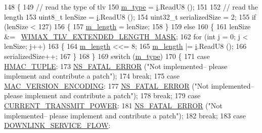 \begin{DoxyCode}
148 \{
149   \textcolor{comment}{// read the type of tlv}
150   \hyperlink{classns3_1_1Tlv_a16281bcabeafd34ba3a0f70823295ff2}{m\_type} = \hyperlink{bernuolliDistribution_8m_a6f6ccfcf58b31cb6412107d9d5281426}{i}.ReadU8 ();
151 
152   \textcolor{comment}{// read the length}
153   uint8\_t lenSize = \hyperlink{bernuolliDistribution_8m_a6f6ccfcf58b31cb6412107d9d5281426}{i}.ReadU8 ();
154   uint32\_t serializedSize = 2;
155   \textcolor{keywordflow}{if} (lenSize < 127)
156     \{
157       \hyperlink{classns3_1_1Tlv_a283be5043bd1d6accea0fb54b27824ce}{m\_length} = lenSize;
158     \}
159   \textcolor{keywordflow}{else}
160     \{
161       lenSize &= ~\hyperlink{wimax-tlv_8h_a590060b4cac40c59bb72398847174fae}{WIMAX\_TLV\_EXTENDED\_LENGTH\_MASK};
162       \textcolor{keywordflow}{for} (\textcolor{keywordtype}{int} j = 0; j < lenSize; j++)
163         \{
164           \hyperlink{classns3_1_1Tlv_a283be5043bd1d6accea0fb54b27824ce}{m\_length} <<= 8;
165           \hyperlink{classns3_1_1Tlv_a283be5043bd1d6accea0fb54b27824ce}{m\_length} |= \hyperlink{bernuolliDistribution_8m_a6f6ccfcf58b31cb6412107d9d5281426}{i}.ReadU8 ();
166           serializedSize++;
167         \}
168     \}
169   \textcolor{keywordflow}{switch} (\hyperlink{classns3_1_1Tlv_a16281bcabeafd34ba3a0f70823295ff2}{m\_type})
170     \{
171     \textcolor{keywordflow}{case} \hyperlink{classns3_1_1Tlv_ab275ea003645d46aada8e2b351de90e3a98f9ddf5aa70b719dd404ecb9897d7d0}{HMAC\_TUPLE}:
173       \hyperlink{group__fatal_ga5131d5e3f75d7d4cbfd706ac456fdc85}{NS\_FATAL\_ERROR} (\textcolor{stringliteral}{"Not implemented-- please implement and contribute a patch"});
174       \textcolor{keywordflow}{break};
175     \textcolor{keywordflow}{case} \hyperlink{classns3_1_1Tlv_ab275ea003645d46aada8e2b351de90e3aa1dd3a9930fedc965c625fa2568d7d29}{MAC\_VERSION\_ENCODING}:
177       \hyperlink{group__fatal_ga5131d5e3f75d7d4cbfd706ac456fdc85}{NS\_FATAL\_ERROR} (\textcolor{stringliteral}{"Not implemented-- please implement and contribute a patch"});
178       \textcolor{keywordflow}{break};
179     \textcolor{keywordflow}{case} \hyperlink{classns3_1_1Tlv_ab275ea003645d46aada8e2b351de90e3a79ba3aacb5bca9a9df3d65068f1d8a59}{CURRENT\_TRANSMIT\_POWER}:
181       \hyperlink{group__fatal_ga5131d5e3f75d7d4cbfd706ac456fdc85}{NS\_FATAL\_ERROR} (\textcolor{stringliteral}{"Not implemented-- please implement and contribute a patch"});
182       \textcolor{keywordflow}{break};
183     \textcolor{keywordflow}{case} \hyperlink{classns3_1_1Tlv_ab275ea003645d46aada8e2b351de90e3a75b57001056f0b9395e079873cb38f1d}{DOWNLINK\_SERVICE\_FLOW}:

\end{DoxyCode}
